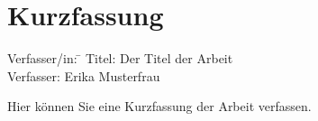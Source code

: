 \chapter*{Kurzfassung}
\begin{tabbing}
	Verfasser/in: \= \kill
	Titel: \> Der Titel der Arbeit\\
	Verfasser: \> Erika Musterfrau 
\end{tabbing}
Hier können Sie eine Kurzfassung der Arbeit verfassen. 